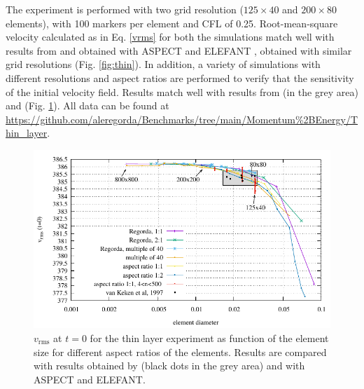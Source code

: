 The experiment is performed with two grid resolution ($125\times40$ and $200\times80$ elements), with 100 markers per element and CFL of 0.25. Root-mean-square velocity calculated as in Eq. \ref{vrms} for both the simulations match well with results from \citet{vanKeken1997} and obtained with ASPECT
\citep{Kronbichler2012,Heister2017,Bangerth2020,Bangerth2020a} and ELEFANT \citep{Thieulot2014}, obtained with similar grid resolutions
(Fig. \ref{fig:thin}). In addition, a variety of simulations with different resolutions and aspect ratios are performed to verify that the sensitivity of the
initial velocity field. Results match well with results from \citet{vanKeken1997} (in the grey area) and \citet{Thieulot2014} (Fig. \ref{fig:thin_initial}). 
All data can be found at \url{https://github.com/aleregorda/Benchmarks/tree/main/Momentum%2BEnergy/Thin_layer}.

\begin{figure}[h!]
\centering
\includegraphics[width=12cm]{./Figures/vrmszero.pdf}
\caption{$v_{\textrm{rms}}$ at $t=0$ for the thin layer experiment as function of the element size for different aspect ratios of the elements. Results are compared
with results obtained by \citet{vanKeken1997} (black dots in the grey area) and with ASPECT and ELEFANT.}
\label{fig:thin_initial}
\end{figure}